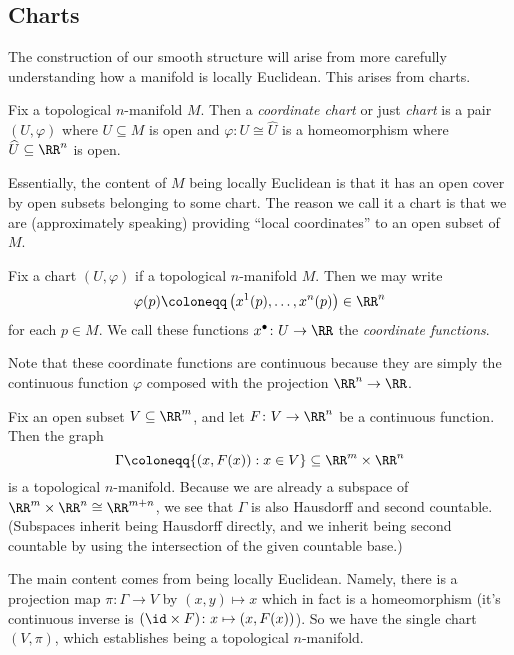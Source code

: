 \documentclass[../notes.tex]{subfiles}
\begin{document}
\subsection{Charts}
The construction of our smooth structure will arise from more carefully understanding how a manifold is locally Euclidean. This arises from charts.
\begin{definition}[chart]
	Fix a topological $n$-manifold $M$. Then a \textit{coordinate chart} or just \textit{chart} is a pair $(U,\varphi)$ where $U\subseteq M$ is open and $\varphi\colon U\cong\widehat U$ is a homeomorphism where $\widehat U\subseteq\RR^n$ is open.
\end{definition}
Essentially, the content of $M$ being locally Euclidean is that it has an open cover by open subsets belonging to some chart. The reason we call it a chart is that we are (approximately speaking) providing ``local coordinates'' to an open subset of $M$.
\begin{definition}
	Fix a chart $(U,\varphi)$ if a topological $n$-manifold $M$. Then we may write
	\[\varphi(p)\coloneqq\left(x^1(p),\ldots,x^n(p)\right)\in\RR^n\]
	for each $p\in M$. We call these functions $x^\bullet\colon U\to\RR$ the \textit{coordinate functions}.
\end{definition}
Note that these coordinate functions are continuous because they are simply the continuous function $\varphi$ composed with the projection $\RR^n\to\RR$.
\begin{example} \label{ex:graph-top-man}
	Fix an open subset $V\subseteq\RR^m$, and let $F\colon V\to\RR^n$ be a continuous function. Then the graph
	\[\Gamma\coloneqq\{(x,F(x)):x\in V\}\subseteq\RR^m\times\RR^n\]
	is a topological $n$-manifold. Because we are already a subspace of $\RR^m\times\RR^n\cong\RR^{m+n}$, we see that $\Gamma$ is also Hausdorff and second countable. (Subspaces inherit being Hausdorff directly, and we inherit being second countable by using the intersection of the given countable base.)
	
	The main content comes from being locally Euclidean. Namely, there is a projection map $\pi\colon\Gamma\to V$ by $(x,y)\mapsto x$ which in fact is a homeomorphism (it's continuous inverse is $({\id}\times F)\colon x\mapsto(x,F(x))$). So we have the single chart $(V,\pi)$, which establishes being a topological $n$-manifold.
\end{example}
\end{document}
